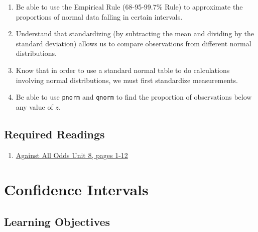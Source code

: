 \documentclass[letterpaper,9pt,twocolumn,twoside,printwatermark=false]{pinp}
\providecommand{\tightlist}{%
  \setlength{\itemsep}{0pt}\setlength{\parskip}{0pt}}
\begin{document}
\begin{enumerate}
\def\labelenumi{\arabic{enumi}.}
\tightlist
\item
  Be able to use the Empirical Rule (68-95-99.7\% Rule) to approximate
  the proportions of normal data falling in certain intervals.
\item
  Understand that standardizing (by subtracting the mean and dividing by
  the standard deviation) allows us to compare observations from
  different normal distributions.
\item
  Know that in order to use a standard normal table to do calculations
  involving normal distributions, we must first standardize
  measurements.
\item
  Be able to use \texttt{pnorm} and \texttt{qnorm} to find the
  proportion of observations below any value of \(z\).
\end{enumerate}

\hypertarget{required-readings}{%
\subsection{Required Readings}\label{required-readings}}

\begin{enumerate}
\item \href{https://www.learner.org/courses/againstallodds/pdfs/AgainstAllOdds_StudentGuide_Unit08.pdf#page=1}{Against All Odds Unit 8, pages 1-12}
\end{enumerate}

\vspace*{0.25cm}

\hypertarget{confidence-intervals}{%
\section{Confidence Intervals}\label{confidence-intervals}}

\hypertarget{learning-objectives-1}{%
\subsection{Learning Objectives}\label{learning-objectives-1}}
\end{document}
